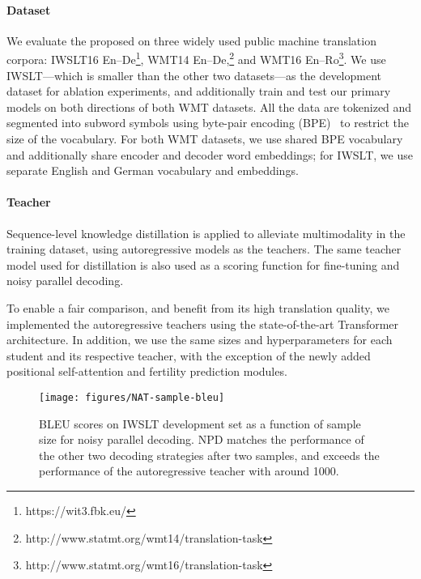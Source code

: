 \documentclass{article} \usepackage{iclr2018_conference,times}
\begin{document}
\paragraph{Dataset} We evaluate the proposed \model{} on three widely used public machine translation corpora: IWSLT16 En--De\footnote{https://wit3.fbk.eu/}, WMT14 En--De,\footnote{http://www.statmt.org/wmt14/translation-task} and WMT16 En--Ro\footnote{http://www.statmt.org/wmt16/translation-task}. We use IWSLT---which is smaller than the other two datasets---as the development dataset for ablation experiments, and additionally train and test our primary models on both directions of both WMT datasets.
All the data are tokenized and segmented into subword symbols using byte-pair encoding (BPE)~\citep{sennrich2015neural} to restrict the size of the vocabulary. For both WMT datasets, we use shared BPE vocabulary and additionally share encoder and decoder word embeddings; for IWSLT, we use separate English and German vocabulary and embeddings.
\vspace{-5pt}
\paragraph{Teacher} Sequence-level knowledge distillation is applied to alleviate multimodality in the training dataset, using autoregressive models as the teachers. The same teacher model used for distillation is also used as a scoring function for fine-tuning and noisy parallel decoding.

To enable a fair comparison, and benefit from its high translation quality, we implemented the autoregressive teachers using the state-of-the-art Transformer architecture. In addition, we use the same sizes and hyperparameters for each student and its respective teacher, with the exception of the newly added positional self-attention and fertility prediction modules.

\begin{wrapfigure}{r}{0.45\textwidth} 
\vspace{-10pt}
\centering
\texttt{[image: figures/NAT-sample-bleu]}
\caption{\label{fig.noisy_decoding} BLEU scores on IWSLT development set as a function of sample size for noisy parallel decoding. NPD matches the performance of the other two decoding strategies after two samples, and exceeds the performance of the autoregressive teacher with around 1000.}
\vspace{-20pt}
\end{wrapfigure}
\end{document}
